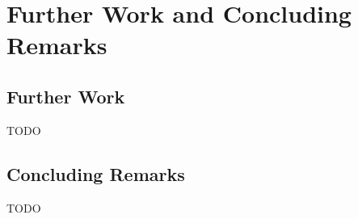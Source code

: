 \chapter{Further Work and Concluding Remarks}

\section{Further Work}

TODO

\section{Concluding Remarks}

TODO
